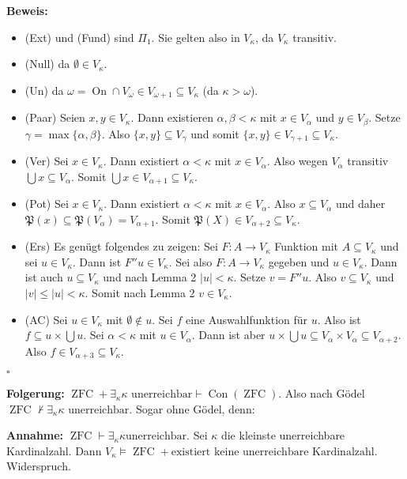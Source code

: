 \documentclass[a4paper,fontsize=11pt]{scrartcl}
\newcommand{\ZFC}{\operatorname{ZFC}}
\newcommand{\Con}{\operatorname{Con}}
\newcommand{\On}{\operatorname{On}}
\begin{document}
{\bf Beweis:}
\begin{itemize}
\item (Ext) und (Fund) sind $\Pi_1$. Sie gelten also in $V_\kappa$, da
  $V_\kappa$ transitiv.
\item (Null) da $\emptyset\in V_\kappa$.
\item (Un) da $\omega=\On\cap V_\omega \in V_{\omega+1}\subseteq
  V_\kappa$ (da $\kappa>\omega$).
\item (Paar) Seien $x,y\in V_\kappa$. Dann existieren
  $\alpha,\beta<\kappa$ mit $x\in V_\alpha$ und $y\in V_\beta$. Setze
  $\gamma=\max\{\alpha,\beta\}$. Also $\{x,y\}\subseteq V_\gamma$ und
  somit $\{x,y\}\in V_{\gamma+1}\subseteq V_\kappa$.
\item (Ver) Sei $x\in V_\kappa$. Dann existiert $\alpha<\kappa$ mit
  $x\in V_\alpha$. Also wegen $V_\alpha$ transitiv $\bigcup x\subseteq
  V_\alpha$. Somit $\bigcup x\in V_{\alpha+1}\subseteq V_\kappa$.
\item (Pot) Sei $x\in V_\kappa$. Dann existiert $\alpha<\kappa$ mit
  $x\in V_\alpha$. Also $x\subseteq V_\alpha$ und daher
  $\mathfrak{P}(x)\subseteq\mathfrak{P}(V_\alpha)=V_{\alpha+1}$. Somit
  $\mathfrak{P}(X)\in V_{\alpha+2}\subseteq V_\kappa$.
\item (Ers) Es genügt folgendes zu zeigen: Sei $F:A\rightarrow
  V_\kappa$ Funktion mit $A\subseteq V_\kappa$ und sei $u\in
  V_\kappa$. Dann ist $F''u\in V_\kappa$. Sei also $F:A\rightarrow
  V_\kappa$ gegeben und $u\in V_\kappa$. Dann ist auch $u\subseteq
  V_\kappa$ und nach Lemma 2 $|u|<\kappa$. Setze $v=F''u$. Also
  $v\subseteq V_\kappa$ und $|v|\le |u|<\kappa$. Somit nach Lemma 2
  $v\in V_\kappa$.
\item (AC) Sei $u\in V_\kappa$ mit $\emptyset\not\in u$. Sei $f$ eine
  Auswahlfunktion für $u$. Also ist $f\subseteq u\times\bigcup u$. Sei
  $\alpha<\kappa$ mit $u\in V_\alpha$. Dann ist aber $u\times\bigcup
  u\subseteq V_\alpha\times V_\alpha\subseteq V_{\alpha+2}$. Also
  $f\in V_{\alpha+3}\subseteq V_\kappa$.
\end{itemize}
\hfill $\square$

{\bf Folgerung:} $\ZFC + \exists_\kappa \kappa\mbox{ unerreichbar
}\vdash \Con(\ZFC)$. Also nach Gödel
$\ZFC\not\vdash\exists_\kappa\kappa\mbox{ unerreichbar}$. Sogar ohne
Gödel, denn:

{\bf Annahme:} $\ZFC\vdash\exists_\kappa\kappa\mbox{
  unerreichbar}$. Sei $\kappa$ die kleinste unerreichbare
Kardinalzahl. Dann $V_\kappa\models\ZFC+\mbox{existiert keine
  unerreichbare Kardinalzahl}$. Widerspruch.
\end{document}
